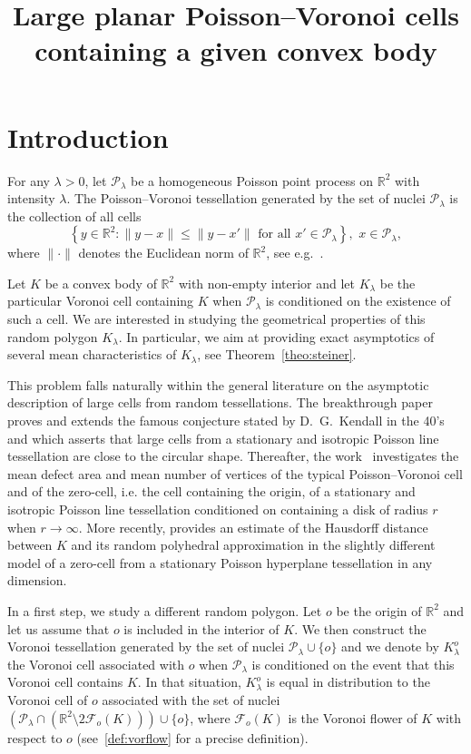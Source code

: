 \documentclass[AHL,Unicode,longabstracts,published]{cedram}
\title[Large planar Poisson--Voronoi cells containing a given convex body]{Large planar Poisson--Voronoi cells containing a given convex body}
\author[\initial{P.} \lastname{Calka}]{\firstname{Pierre} \lastname{Calka}}
\author[\initial{Y.} \lastname{Demichel}]{\firstname{Yann} \lastname{Demichel}}
\author[\initial{N.} \lastname{Enriquez}]{\firstname{Nathana\"el} \lastname{Enriquez}}
\newcommand{\cF}{\mathcal{F}}
\newcommand{\cP}{\mathcal{P}}
\newcommand{\la}{\lambda}
\newcommand{\R}{\mathbb{R}}
\newcommand{\pass}{\vspace{0.3cm}\noindent}
\newcommand{\noi}{\noindent}
\newcommand{\R}{\mathbb{R}}
\begin{document}
\maketitle


\section{Introduction}\label{sec:intro}

For any $\lambda>0$, let $\cP_{\lambda}$ be a homogeneous Poisson point process on $\R^2$ with intensity $\lambda$. The Poisson--Voronoi tessellation generated by the set of nuclei $\cP_\lambda$ is the collection of all cells
\[
\left\{y\in\R^2:\|y-x\|\le \|y-x'\| \text{ for all } x'\in \cP_\lambda\right\}, \,\, x\in \cP_\lambda,
\]
where $\|\cdot\|$ denotes the Euclidean norm of $\R^2$, see e.g.~\cite{mol94,okabe}.

Let $K$ be a convex body of $\R^2$ with non-empty interior and let $K_{\lambda}$ be the particular Voronoi cell containing $K$ when $\cP_\lambda$ is conditioned on the existence of such a cell. We are interested in studying the geometrical properties of this random polygon $K_{\lambda}$. In particular, we aim at providing exact asymptotics of several mean characteristics of $K_{\lambda}$, see Theorem~\ref{theo:steiner}.

This problem falls naturally within the general literature on the asymptotic description of large cells from random tessellations. The breakthrough paper~\cite{hrs04} proves and extends the famous conjecture stated by D.~G.~Kendall in the 40's and which asserts that large cells from a stationary and isotropic Poisson line tessellation are close to the circular shape. Thereafter, the work~\cite{cs05} investigates the mean defect area and mean number of vertices of the typical Poisson--Voronoi cell and of the zero-cell, i.e. the cell containing the origin, of a stationary and isotropic Poisson line tessellation conditioned on containing a disk of radius $r$ when $r\to\infty$. More recently, \cite{hs14} provides an estimate of the Hausdorff distance between $K$ and its random polyhedral approximation in the slightly different model of a zero-cell from a stationary Poisson hyperplane tessellation in any dimension.

In a first step, we study a different random polygon. Let $o$ be the origin of $\R^2$ and let us assume that $o$ is included in the interior of $K$. We then construct the Voronoi tessellation generated by the set of nuclei $\cP_\la\cup\{o\}$ and we denote by $K_{\lambda}^o$ the Voronoi cell associated with $o$ when $\cP_\lambda$ is conditioned on the event that this Voronoi cell contains $K$. In that situation, $K_{\lambda}^o$ is equal in distribution to the Voronoi cell of $o$ associated with the set of nuclei $(\cP_{\lambda}\cap (\R^2\setminus 2\cF_o(K)))\cup\{o\}$, where $\cF_o(K)$ is the Voronoi flower of $K$ with respect to $o$ (see~\eqref{def:vorflow} for a precise definition).
\end{document}
